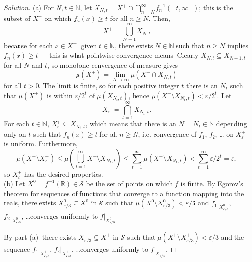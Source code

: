 \documentclass[10pt]{article}
\providecommand{\eps}{\varepsilon}
\providecommand{\NN}{\mathbb N}
\providecommand{\RR}{\mathbb R}
\providecommand{\inv}{^{-1}}
\newenvironment{soln}{\begin{proof}[Solution]}{\end{proof}}
\begin{document}
\begin{soln}
    (a) For $N,t\in\NN$, let $X_{N,t} = X^+\cap
    \bigcap_{n=N}^\infty f_n\inv([t,\infty])$;
    this is the subset of $X^+$ on which
    $f_n(x) \ge t$ for all $n\ge N$. Then,
    \begin{equation*}
	X^+ = \bigcup_{N=1}^\infty X_{N,t}
    \end{equation*}
    because for each $x\in X^+$, given $t\in\NN$, there exists $N\in\NN$
    such that $n\ge N$ implies $f_n(x)\ge t$ ---
    this is what pointwise convergence means.
    Clearly $X_{N,t}\subseteq X_{N+1,t}$ for all $N$ and $t$,
    so monotone convergence of measure gives
    \begin{equation*}
	\mu(X^+) = \lim_{N\to\infty} \mu(X^+\cap X_{N,t})
    \end{equation*}
    for all $t>0$. The limit is finite, so for each positive integer $t$
    there is an $N_t$ such that $\mu(X^+)$ is within $\eps/2^t$ of
    $\mu(X_{N_t,t})$, hence $\mu(X^+\setminus X_{N_t,t}) < \eps/2^t$. Let
    \begin{equation*}
	X^+_\eps = \bigcap_{t=1}^\infty X_{N_t,t}.
    \end{equation*}
    For each $t\in\NN$, $X^+_\eps\subseteq X_{N_t,t}$, which means that
    there is an $N=N_t\in\NN$ depending only on $t$ such that
    $f_n(x)\ge t$ for all $n\ge N$, i.e. convergence of $f_1$, $f_2$, \dots
    on $X^+_\eps$ is uniform. Furthermore,
    \begin{equation*}
	\mu(X^+\setminus X^+_\eps) \le
	\mu\left(\bigcup_{t=1}^\infty X^+\setminus X_{N_t,t}\right) \le
	\sum_{t=1}^\infty \mu(X^+\setminus X_{N_t,t}) < \sum_{t=1}^\infty \eps/2^t
	= \eps,
    \end{equation*}
    so $X^+_\eps$ has the desired properties.
    \\

    (b) Let $X^0 = f\inv(\RR)\in\mathcal S$
    be the set of points on which $f$ is finite.
    By Egorov's theorem for sequences of functions
    that converge to a function mapping into the reals,
    there exists $X^0_{\eps/3}\subseteq X^0$ in $\mathcal S$ such that
    $\mu(X^0\setminus X^0_{\eps/3})<\eps/3$ and
    $f_1|_{X^0_{\eps/3}}$, $f_2|_{X^0_{\eps/3}}$, \dots converges
    uniformly to $f|_{X^0_{\eps/3}}$.

    By part (a), there exists $X^+_{\eps/3}\subseteq X^+$ in $\mathcal S$
    such that $\mu(X^+\setminus X^+_{\eps/3}) < \eps/3$ and the sequence
    $f_1|_{X^+_{\eps/3}}$, $f_2|_{X^+_{\eps/3}}$, \dots converges
    uniformly to $f|_{X^+_{\eps/3}}$.


\end{soln}
\end{document}
